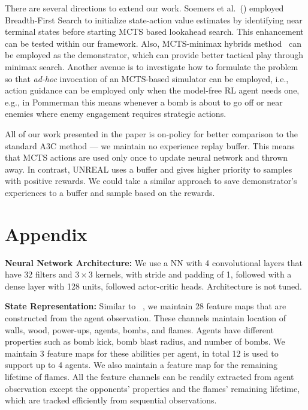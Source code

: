\documentclass[letterpaper]{article} %
\begin{document}
There are several directions to extend our work. Soemers et al.~(\citeyear{soemers2016enhancements}) employed Breadth-First Search to initialize state-action value estimates by identifying near terminal states before starting MCTS based lookahead search. This enhancement can be tested within our framework. Also, MCTS-minimax hybrids method~\cite{baier2018mcts} can be employed as the demonstrator, which can provide better tactical play through minimax search. Another avenue is to investigate how to formulate the problem so that \emph{ad-hoc} invocation of an MCTS-based simulator can be employed, i.e., action guidance can be employed only when the model-free RL agent needs one, e.g., in Pommerman this means whenever a bomb is about to go off or near enemies where enemy engagement requires strategic actions.

All of our work presented in the paper is on-policy for better comparison to the standard A3C method --- we maintain no experience replay buffer. This means that MCTS actions are used only once to update neural network and thrown away. In contrast, UNREAL uses a buffer and gives higher priority to samples with positive rewards. We could take a similar approach to save demonstrator's experiences to a buffer and sample based on the rewards.

\vspace{-1.62mm}
\section*{Appendix}



\textbf{Neural Network Architecture:} We use a NN with 4 convolutional layers that have 32 filters and $3 \times 3$ kernels, with stride and padding of 1, followed with a dense layer with 128 units, followed actor-critic heads. Architecture is not tuned.

\textbf{State Representation:} Similar to ~\cite{resnick2018pommerman}, we maintain 28 feature maps that are constructed from the agent observation. These channels maintain location of walls, wood, power-ups, agents, bombs, and flames. Agents have different properties such as bomb kick, bomb blast radius, and number of bombs. We maintain 3 feature maps for these abilities per agent, in total 12 is used to support up to 4 agents. We also maintain a feature map for the remaining lifetime of flames. All the feature channels can be readily extracted from agent observation except the opponents' properties and the flames' remaining lifetime, which are tracked efficiently from sequential observations.
\end{document}
